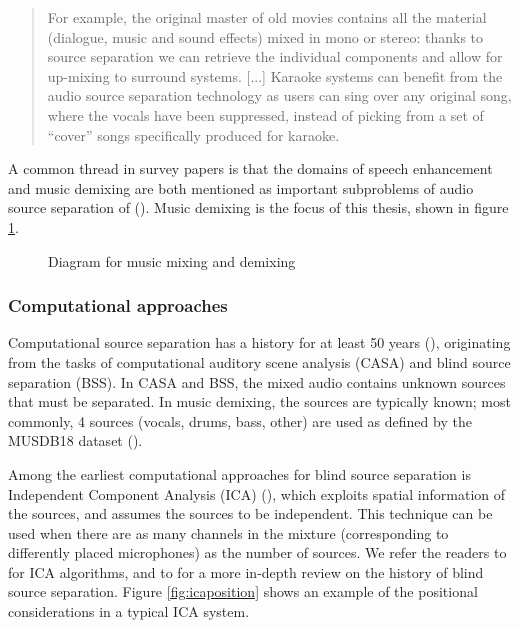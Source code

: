 \documentclass[report.tex]{subfiles}
\begin{document}
\begin{quote}
	For example, the original master of old movies contains all the material (dialogue, music and sound effects) mixed in mono or stereo: thanks to source separation we can retrieve the individual components and allow for up-mixing to surround systems. [...] Karaoke systems can benefit from the audio source separation technology as users can sing over any original song, where the vocals have been suppressed, instead of picking from a set of ``cover'' songs specifically produced for karaoke.
\end{quote}

A common thread in survey papers is that the domains of speech enhancement and music demixing are both mentioned as important subproblems of audio source separation of (\cite{musicsepintro1, musicsepsurvey}). Music demixing is the focus of this thesis, shown in figure \ref{fig:mixingdiagrams}.

\begin{figure}[ht]
	\centering
	\caption{Diagram for music mixing and demixing}
	\label{fig:mixingdiagrams}
\end{figure}

\newpagefill

\subsubsection{Computational approaches}

Computational source separation has a history for at least 50 years (\cite{musicsepsurvey, musicsepintro1}), originating from the tasks of computational auditory scene analysis (CASA) and blind source separation (BSS). In CASA and BSS, the mixed audio contains unknown sources that must be separated. In music demixing, the sources are typically known; most commonly, 4 sources (vocals, drums, bass, other) are used as defined by the MUSDB18 dataset (\cite{musdb18}).

Among the earliest computational approaches for blind source separation is Independent Component Analysis (ICA)  (\cite{musicsepsurvey, musicsepgood, musicsepintro1}), which exploits spatial information of the sources, and assumes the sources to be independent. This technique can be used when there are as many channels in the mixture (corresponding to differently placed microphones) as the number of sources. We refer the readers to \textcite{ica1, ica2} for ICA algorithms, and to \textcite{blind1, blind2} for a more in-depth review on the history of blind source separation. Figure \ref{fig:icaposition} shows an example of the positional considerations in a typical ICA system.
\end{document}
